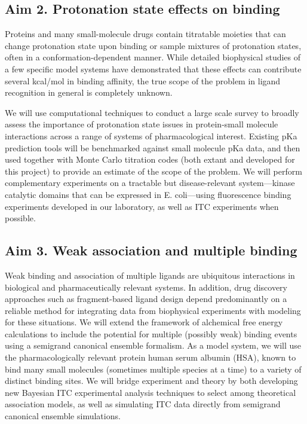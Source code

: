 \documentclass[10pt]{article}
\begin{document}
\subsection*{Aim 2. Protonation state effects on binding}
Proteins and many small-molecule drugs contain titratable moieties that can change protonation state upon binding or sample mixtures of protonation states, often in a conformation-dependent manner. 
While detailed biophysical studies of a few specific model systems have demonstrated that these effects can contribute several kcal/mol in binding affinity, the true scope of the problem in ligand recognition in general is completely unknown. 

We will use computational techniques to conduct a large scale survey to broadly assess the importance of protonation state issues in protein-small molecule interactions across a range of systems of pharmacological interest. 
Existing pKa prediction tools will be benchmarked against small molecule pKa data, and then used together with Monte Carlo titration codes (both extant and developed for this project) to provide an estimate of the scope of the problem. 
We will perform complementary experiments on a tractable but disease-relevant system---kinase catalytic domains that can be expressed in E. coli---using fluorescence binding experiments developed in our laboratory, as well as ITC experiments when possible.

\subsection*{Aim 3. Weak association and multiple binding}
Weak binding and association of multiple ligands are ubiquitous interactions in biological and pharmaceutically relevant systems.
In addition, drug discovery approaches such as fragment-based ligand design depend predominantly on a reliable method for integrating data from biophysical experiments with modeling for these situations.
We will extend the framework of alchemical free energy calculations to include the potential for multiple (possibly weak) binding events using a semigrand canonical ensemble formalism. 
As a model system, we will use the pharmacologically relevant protein human serum albumin (HSA), known to bind many small molecules (sometimes multiple species at a time) to a variety of distinct binding sites.
We will bridge experiment and theory by both developing new Bayesian ITC experimental analysis techniques to select among theoretical association models, as well as simulating ITC data directly from semigrand canonical ensemble simulations.
\end{document}
